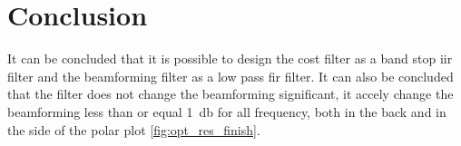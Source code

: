 \section{Conclusion}
It can be concluded that it is possible to design the cost filter as a band stop \gls{iir} filter and the beamforming filter as a low pass \gls{fir} filter. It can also be concluded that the filter does not change the beamforming significant, it accely change the  beamforming less than or equal \SI{1}{\decibel} for all frequency, both in the back and in the side of the polar plot \autoref{fig:opt_res_finish}.





